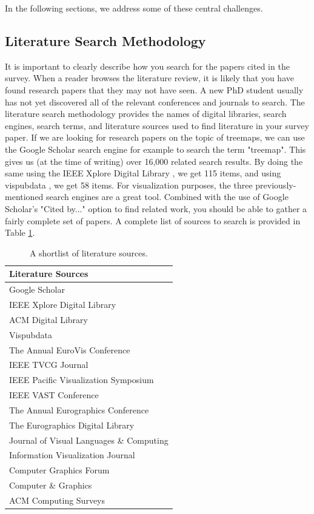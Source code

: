 In the following sections, we address some of these central challenges.

\subsection{Literature Search Methodology} \label{sec:search}
It is important to clearly describe how you search for the papers cited in the survey. When a reader browses the literature review, it is likely that you have found research papers that they may not have seen. A new PhD student usually has not yet discovered all of the relevant conferences and journals to search. The literature search methodology provides the names of digital libraries, search engines, search terms, and literature sources used to find literature in your survey paper. 
If we are looking for research papers on the topic of treemaps, we can use the Google Scholar search engine for example \cite{scholar} to search the term "treemap". This gives us (at the time of writing) over 16,000 related search results. By doing the same using the IEEE Xplore Digital Library \cite{ieeexplore}, we get 115 items, and using vispubdata \cite{isenberg2017VPD}, we get 58 items. For visualization purposes, the three previously-mentioned search engines are a great tool. Combined with the use of Google Scholar's "Cited by..." option to find related work, you should be able to gather a fairly complete set of papers. A complete list of sources to search is provided in Table \ref{table:searchTable}.

\begin{table}[t]
\footnotesize
\centering
{}
\begin{tabularx}{0.7\textwidth}{|X|}
\hline \rowcolor{black!30}
Literature Sources \\ \hline
Google Scholar  \cite{scholar}\\
IEEE Xplore Digital Library \cite{ieeexplore}\\
ACM Digital Library \\
Vispubdata \cite{isenberg2017VPD}\\
The Annual EuroVis Conference   \\
IEEE TVCG Journal  \\
IEEE Pacific Visualization Symposium  \\
IEEE VAST Conference  \\
The Annual Eurographics Conference  \\
The Eurographics Digital Library \\
Journal of Visual Languages \& Computing  \\
Information Visualization Journal  \\
Computer Graphics Forum  \\
Computer \& Graphics \\
ACM Computing Surveys  \\ 
\hline
\end{tabularx}
\caption{A shortlist of literature sources.} \vspace{-0.3cm}\label{table:searchTable}
\end{table} 

